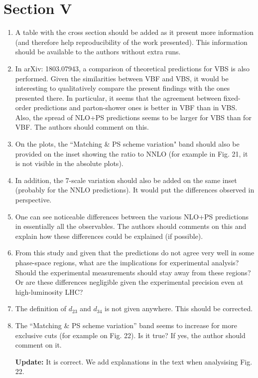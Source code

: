 \documentclass[12pt]{article}
\begin{document}
\section*{Section V}
\begin{enumerate}
\item A table with the cross section should be added as it present more information (and therefore help reproducibility of the work presented). This information should be available to the authors without extra runs.
\item In arXiv: 1803.07943, a comparison of theoretical predictions for VBS is also performed. Given the similarities between VBF and VBS, it would be interesting to qualitatively compare the present findings with the ones presented there. In particular, it seems that the agreement between fixed-order predictions and parton-shower ones is better in VBF than in VBS. Also, the spread of NLO+PS predictions seems to be larger for VBS than for VBF. The authors should comment on this.
\item On the plots, the ``Matching \& PS scheme variation" band should also be provided on the inset showing the ratio to NNLO (for example in Fig. 21, it is not visible in the absolute plots).
\item In addition, the 7-scale variation should also be added on the same inset (probably for the NNLO predictions). It would put the differences observed in perspective.
\item One can see noticeable differences between the various NLO+PS predictions in essentially all the observables. The authors should comments on this and explain how these differences could be explained (if possible).
\item From this study and given that the predictions do not agree very well in some phase-space regions, what are the implications for experimental analysis? Should the experimental measurements should stay away from these regions? Or are these differences negligible given the experimental precision even at high-luminosity LHC?
\item The definition of $d_{23}$ and $d_{34}$ is not given anywhere. This should be corrected.
\item The “Matching \& PS scheme variation” band seems to increase for more exclusive cuts (for example on Fig. 22). Is it true? If yes, the author should comment on it.

{\bf Update:} It is correct. We add explanations in the text when analysising Fig. 22.
\end{enumerate}
\end{document}
